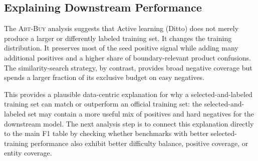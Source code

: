 \subsection{Explaining Downstream Performance}

The \textsc{Abt-Buy} analysis suggests that Active learning (Ditto) does not merely produce a larger or differently labeled training set. It changes the training distribution. It preserves most of the seed positive signal while adding many additional positives and a higher share of boundary-relevant product confusions. The similarity-search strategy, by contrast, provides broad negative coverage but spends a larger fraction of its exclusive budget on easy negatives.

This provides a plausible data-centric explanation for why a selected-and-labeled training set can match or outperform an official training set: the selected-and-labeled set may contain a more useful mix of positives and hard negatives for the downstream model. The next analysis step is to connect this explanation directly to the main F1 table by checking whether benchmarks with better selected-training performance also exhibit better difficulty balance, positive coverage, or entity coverage.
